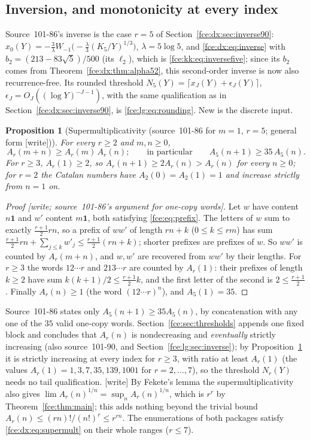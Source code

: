 \documentclass[11pt,a4paper]{article}
\numberwithin{equation}{section}
\newtheorem{proposition}[theorem]{Proposition}
\theoremstyle{definition}\newtheorem{definition}[theorem]{Definition}
\theoremstyle{remark}\newtheorem{remark}[theorem]{Remark}
\newcommand{\one}{\boldsymbol 1}
\begin{document}
\subsection{Inversion, and monotonicity at every index}\label{fce:dx:sec:monotone}
Source~101-86's inverse is the case $r=5$ of
Section~\ref{fce:dx:sec:inverse90}: $x_0(Y)=-\frac3\lambda
W_{-1}\bigl(-\frac\lambda3(K_5/Y)^{1/3}\bigr)$, $\lambda=5\log5$, and
\eqref{fce:dx:eq:inverse} with $b_2=(213-83\sqrt5)/500$ (its $\ell_2$), which
is \eqref{fce:kk:eq:inversefive}; since its $b_2$ comes from
Theorem~\ref{fce:dx:thm:alpha52}, this second-order inverse is now also
recurrence-free. Its rounded threshold
$N_5(Y)=\lceil x_J(Y)+\epsilon_J(Y)\rceil$, $\epsilon_J=O_J((\log Y)^{-J-1})$,
with the same qualification as in Section~\ref{fce:dx:sec:inverse90}, is
\eqref{fce:lg:eq:rounding}. New is the discrete input.

\begin{proposition}[Supermultiplicativity (source~101-86 for $m=1$, $r=5$; general form \textup{[write]})]\label{fce:dx:prop:supermult}
For every $r\ge2$ and $m,n\ge0$,
\begin{equation}\label{fce:dx:eq:supermult}
 A_r(m+n)\ge A_r(m)\,A_r(n);\qquad\text{in particular}\qquad
 A_5(n+1)\ge35\,A_5(n).
\end{equation}
For $r\ge3$, $A_r(1)\ge2$, so $A_r(n+1)\ge2A_r(n)>A_r(n)$ for every $n\ge0$;
for $r=2$ the Catalan numbers have $A_2(0)=A_2(1)=1$ and increase strictly
from $n=1$ on.
\end{proposition}
\begin{proof}[Proof \textup{[write; source~101-86's argument for one-copy words]}]
Let $w$ have content $n\one$ and $w'$ content $m\one$, both satisfying
\eqref{fce:eq:prefix}. The letters of $w$ sum to exactly $\frac{r+1}2rn$, so a
prefix of $ww'$ of length $rn+k$ ($0\le k\le rm$) has sum
$\frac{r+1}2rn+\sum_{j\le k}w'_j\le\frac{r+1}2(rn+k)$; shorter prefixes are
prefixes of $w$. So $ww'$ is counted by $A_r(m+n)$, and $w,w'$ are recovered
from $ww'$ by their lengths. For $r\ge3$ the words $12\cdots r$ and
$213\cdots r$ are counted by $A_r(1)$: their prefixes of length $k\ge2$ have
sum $k(k+1)/2\le\frac{r+1}2k$, and the first letter of the second is
$2\le\frac{r+1}2$. Finally $A_r(n)\ge1$ (the word $(12\cdots r)^n$), and
$A_5(1)=35$.
\end{proof}
Source~101-86 states only $A_5(n+1)\ge35A_5(n)$, by concatenation with any
one of the $35$ valid one-copy words. Section~\ref{fce:sec:thresholds}
appends one fixed block and concludes that $A_r(n)$ is nondecreasing and
\emph{eventually} strictly increasing (also source~101-90, and
Section~\ref{fce:lg:sec:inverse}); by
Proposition~\ref{fce:dx:prop:supermult} it is strictly increasing at every
index for $r\ge3$, with ratio at least $A_r(1)$ (the values
$A_r(1)=1,3,7,35,139,1001$ for $r=2,\ldots,7$), so the threshold $N_r(Y)$ needs
no tail qualification. \textup{[write]} By Fekete's lemma the
supermultiplicativity also gives $\lim A_r(n)^{1/n}=\sup_nA_r(n)^{1/n}$, which
is $r^r$ by Theorem~\ref{fce:thm:main}; this adds nothing beyond the trivial
bound $A_r(n)\le(rn)!/(n!)^r\le r^{rn}$. The enumerations of both packages
satisfy \eqref{fce:dx:eq:supermult} on their whole ranges ($r\le7$).
\end{document}
